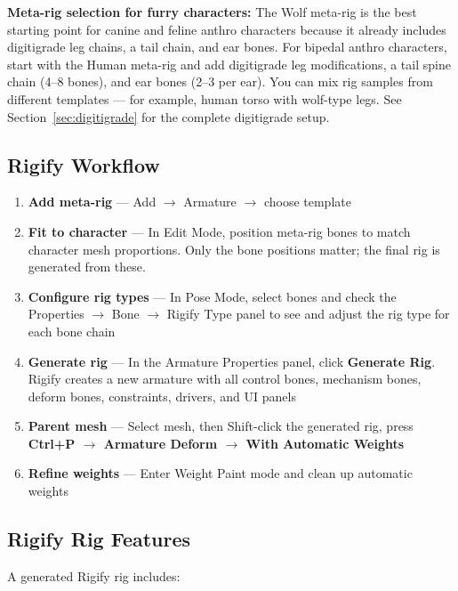 \begin{furrybox}
\textbf{Meta-rig selection for furry characters:} The Wolf meta-rig is the best starting point for canine and feline anthro characters because it already includes digitigrade leg chains, a tail chain, and ear bones. For bipedal anthro characters, start with the Human meta-rig and add digitigrade leg modifications, a tail spine chain (4--8 bones), and ear bones (2--3 per ear). You can mix rig samples from different templates --- for example, human torso with wolf-type legs. See Section~\ref{sec:digitigrade} for the complete digitigrade setup.
\end{furrybox}

\subsection{Rigify Workflow}

\begin{enumerate}[leftmargin=2em]
  \item \textbf{Add meta-rig} --- Add $\rightarrow$ Armature $\rightarrow$ choose template
  \item \textbf{Fit to character} --- In Edit Mode, position meta-rig bones to match character mesh proportions. Only the bone positions matter; the final rig is generated from these.
  \item \textbf{Configure rig types} --- In Pose Mode, select bones and check the Properties $\rightarrow$ Bone $\rightarrow$ Rigify Type panel to see and adjust the rig type for each bone chain
  \item \textbf{Generate rig} --- In the Armature Properties panel, click \textbf{Generate Rig}. Rigify creates a new armature with all control bones, mechanism bones, deform bones, constraints, drivers, and UI panels
  \item \textbf{Parent mesh} --- Select mesh, then Shift-click the generated rig, press \textbf{Ctrl+P $\rightarrow$ Armature Deform $\rightarrow$ With Automatic Weights}
  \item \textbf{Refine weights} --- Enter Weight Paint mode and clean up automatic weights
\end{enumerate}

\subsection{Rigify Rig Features}

A generated Rigify rig includes:

